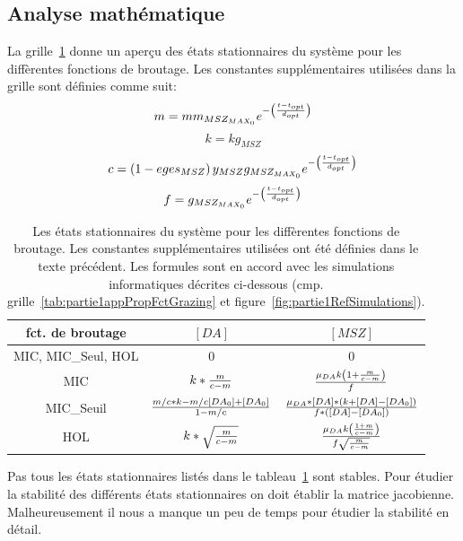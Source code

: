 {\subsection{Analyse mathématique}

\par{
La grille~\ref{tab:partie1etatsStat} donne un aperçu des états stationnaires du système
pour les diffèrentes fonctions de broutage. Les constantes supplémentaires utilisées
dans la grille sont définies comme suit:
}
\[
m = mm_{MSZ_{MAX_0}} e ^{- \left ( {{t-t_{opt}}\over{d_{opt}}} \right )}
\]
\[
k = kg_{MSZ}
\]
\[
c = \left ( 1 - eges_{MSZ} \right ) y_{MSZ}
g_{MSZ_{MAX_0}} e ^{- \left ( {{t-t_{opt}}\over{d_{opt}}} \right )}
\]
\[
f = g_{MSZ_{MAX_0}} e ^{- \left ( {{t-t_{opt}}\over{d_{opt}}} \right )}
\]

\begin{table}[h!]
\begin{center}
\begin{tabular}{ | c | c c | }
\hline
fct. de broutage & $[DA]$ & $[MSZ]$ \\
\hline
MIC, MIC\_Seul, HOL & 0 & 0 \\
MIC & $k * {{m}\over{c-m}}$ & ${{\mu_{DA} k \left ( 1 + {{m}\over{c-m}} \right )}\over{f}}$ \\
MIC\_Seuil & ${{m/c*k-m/c[DA_0]+[DA_0]}\over{1-m/c}}$ & ${\mu_{DA} * [DA] * (k + [DA] - [DA_0])}\over{f *([DA] - [DA_0])}$ \\
HOL & $k*\sqrt{{{m}\over{c-m}}}$ & ${{\mu_{DA}k \left ( 1 + {m}\over{c-m} \right )}\over{f \sqrt{{m}\over{c-m}}}}$ \\
\hline
\end{tabular}
\end{center}
  \caption{Les états stationnaires du système pour les diffèrentes fonctions de broutage. Les
constantes supplémentaires utilisées ont été définies dans le texte précédent. Les formules sont en accord
avec les simulations informatiques décrites ci-dessous (cmp. grille~\ref{tab:partie1appPropFctGrazing} et
figure~\ref{fig:partie1RefSimulations}).
}
  \label{tab:partie1etatsStat}
\end{table}
\FloatBarrier

\par{
Pas tous les états stationnaires listés dans le tableau~\ref{tab:partie1etatsStat} sont stables. Pour
étudier la stabilité des différents états stationnaires on doit établir la matrice jacobienne.
Malheureusement il nous a manque un peu de temps pour étudier la stabilité en détail.
}

}
